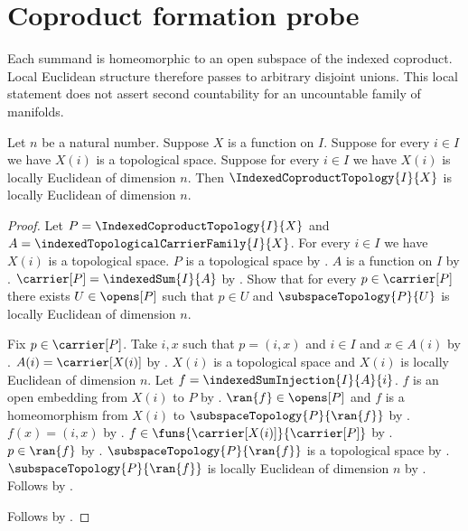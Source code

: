 \section{Coproduct formation probe}





Each summand is homeomorphic to an open subspace of the indexed coproduct.
Local Euclidean structure therefore passes to arbitrary disjoint unions.
This local statement does not assert second countability for an uncountable
family of manifolds.

\begin{theorem}\label{indexed_coproduct_of_locally_euclidean_spaces}
    Let $n$ be a natural number.
    Suppose $X$ is a function on $I$.
    Suppose for every $i\in I$ we have $X(i)$ is a topological space.
    Suppose for every $i\in I$ we have $X(i)$ is locally Euclidean of dimension $n$.
    Then $\IndexedCoproductTopology{I}{X}$ is locally Euclidean of dimension $n$.
\end{theorem}
\begin{proof}
    Let $P=\IndexedCoproductTopology{I}{X}$ and $A=\indexedTopologicalCarrierFamily{I}{X}$.
    For every $i\in I$ we have $X(i)$ is a topological space.
    $P$ is a topological space by .
    $A$ is a function on $I$ by .
    $\carrier[P]=\indexedSum{I}{A}$ by .
    Show that for every $p\in\carrier[P]$ there exists $U\in\opens[P]$ such that
        $p\in U$ and $\subspaceTopology{P}{U}$ is locally Euclidean of dimension $n$.
    \begin{subproof}
        Fix $p\in\carrier[P]$.
        Take $i,x$ such that $p=(i,x)$ and $i\in I$ and $x\in A(i)$ by
            .
        $A(i)=\carrier[X(i)]$ by .
        $X(i)$ is a topological space and $X(i)$ is locally Euclidean of dimension $n$.
        Let $f=\indexedSumInjection{I}{A}{i}$.
        $f$ is an open embedding from $X(i)$ to $P$ by
            .
        $\ran{f}\in\opens[P]$ and $f$ is a homeomorphism from $X(i)$ to
            $\subspaceTopology{P}{\ran{f}}$ by .
        $f(x)=(i,x)$ by .
        $f\in\funs{\carrier[X(i)]}{\carrier[P]}$ by .
        $p\in\ran{f}$ by .
        $\subspaceTopology{P}{\ran{f}}$ is a topological space by
            .
        $\subspaceTopology{P}{\ran{f}}$ is locally Euclidean of dimension $n$ by
            .
        Follows by \auto.
    \end{subproof}
    Follows by .
\end{proof}
